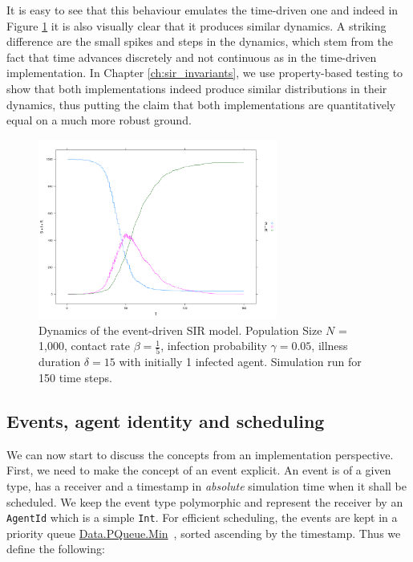 \medskip

It is easy to see that this behaviour emulates the time-driven one and indeed in Figure \ref{fig:sir_eventdriven_dynamics} it is also visually clear that it produces similar dynamics. A striking difference are the small spikes and steps in the dynamics, which stem from the fact that time advances discretely and not continuous as in the time-driven implementation. In Chapter \ref{ch:sir_invariants}, we use property-based testing to show that both implementations indeed produce similar distributions in their dynamics, thus putting the claim that both implementations are quantitatively equal on a much more robust ground.

\begin{figure}
	\centering
	\includegraphics[width=0.7\textwidth, angle=0]{./fig/eventdriven/sir_eventdriven.png}
	\caption[Dynamics of the event-driven SIR model]{Dynamics of the event-driven SIR model. Population Size $N$ = 1,000, contact rate $\beta = \frac{1}{5}$, infection probability $\gamma = 0.05$, illness duration $\delta = 15$ with initially 1 infected agent. Simulation run for 150 time steps.}
	\label{fig:sir_eventdriven_dynamics}
\end{figure}

\subsection{Events, agent identity and scheduling}
We can now start to discuss the concepts from an implementation perspective. First, we need to make the concept of an event explicit. An event is of a given type, has a receiver and a timestamp in \textit{absolute} simulation time when it shall be scheduled. We keep the event type polymorphic and represent the receiver by an \texttt{AgentId} which is a simple \texttt{Int}. For efficient scheduling, the events are kept in a priority queue \href{http://hackage.haskell.org/package/pqueue}{Data.PQueue.Min}~\cite{pqueue_library}, sorted ascending by the timestamp. Thus we define the following:


